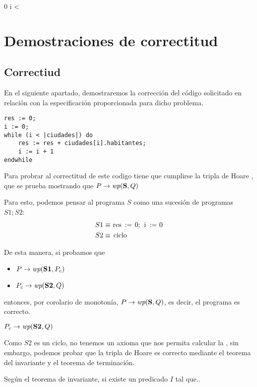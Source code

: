 \documentclass[10pt,a4paper]{article}
\begin{document}
{
	0 \leq i < 
}


\section{Demostraciones de correctitud}

\subsection{Correctiud}
En el siguiente apartado, demostraremos la corrección del código solicitado  en relación con la especificación proporcionada para dicho problema.  

\begin{lstlisting}
res := 0;
i := 0;
while (i < |ciudades|) do
	res := res + ciudades[i].habitantes;
	i := i + 1
endwhile
\end{lstlisting}

Para probrar al correctitud de este codigo tiene que cumplirse la tripla de Hoare , que se prueba mostrando que $P \Then \wp{S}{Q}$

Para esto, podemos pensar al programa $S$ como una sucesión de programas $S1;S2$:
%
\begin{align*}
	S1 & \equiv \lstinline|res := 0; i := 0| \\
	S2 & \equiv \lstinline|ciclo|
\end{align*}

De esta manera, si probamos que

\begin{itemize}
	\item $P \Then \wp{S1}{P_c}$
	\item $P_c \Then \wp{S2}{Q}$
\end{itemize}

entonces, por corolario de monotonía, $P \Then \wp{S}{Q}$, es decir, el programa es correcto.
\bigskip

{\large$P_c \Then \wp{S2}{Q}$}
\medskip

Como $S2$ es un ciclo, no tenemos un axioma que nos permita calcular la , sin embargo, podemos probar que la tripla de Hoare  es correcto mediante el teorema del invariante y el teorema de terminación.
\pagebreak

Según el teorema de invariante, si existe un predicado $I$ tal que.. \par
\end{document}
